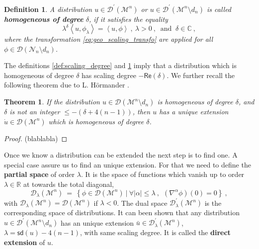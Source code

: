 \documentclass[12pt]{book}
\newcommand{\sd}{\mathsf{sd}}
\renewcommand{\Re}{\mathsf{Re}}
\newcommand{\abs}[1]{\left|#1\right|}
\newcommand{\sm}[1]{\left\langle#1\right\rangle}
\newcommand{\Dcal}{\mathcal{D}}
\newcommand{\Mcal}{\mathcal{M}}
\newcommand{\Ncal}{\mathcal{N}}
\newcommand{\Cbb}{\mathbb{C}}
\newcommand{\Rbb}{\mathbb{R}}
\theoremstyle{break}
\newtheorem{theorem}{Theorem}
\newtheorem{definition}{Definition}
\begin{document}
\begin{definition}\label{def:homogeneous}
A distribution $u \in \Dcal^\prime(\Mcal^n)$ or $u \in \Dcal^\prime(\Mcal^n\setminus d_n)$ is called {\bf homogeneous of degree} $\delta$, if it satisfies the equality
%
\begin{equation*}
\lambda^{\delta} \sm{ u , \phi_\lambda } = \sm{ u , \phi } \ , \ \lambda > 0 \ , \ \mbox{ and } \ \delta \in \Cbb \ ,
\end{equation*}
%
where the transformation \eqref{eq:geo_scaling_transfo} are applied for all $\phi \in \Dcal(\Ncal_n\setminus d_n)$.
\end{definition}


The definitions \ref{def:scaling_degree} and \ref{def:homogeneous} imply that a distribution which is homogeneous of degree $\delta$ has scaling degree $-\Re(\delta)$. We further recall the following theorem due to L. Hörmander \cite{hormander_analysis_1990}.


\begin{theorem}
If the distribution $u \in \Dcal(\Mcal^n\setminus d_n)$ is homogeneous of degree $\delta$, and
$\delta$ is not an integer $\leq -(\delta+4(n-1))$, then $u$ has a unique extension $\dot{u} \in \Dcal(\Mcal^n)$ which is homogeneous of degree $\delta$.
\end{theorem}


\begin{proof}
(blablabla)
\end{proof}


Once we know a distribution can be extended the next step is to find one. A special case assure us to find an unique extension. For that we need to define the \textbf{partial space} of order $\lambda$. It is the space of functions which vanish up to order $\lambda \in \Rbb$ at towards the total diagonal, 
%
\begin{equation*}
\Dcal_{\lambda}(\Mcal^n) \ = \ \left\{ \phi \in \Dcal(\Mcal^n) \ | \ \forall \abs{\alpha} \leq \lambda\ , \ \ \left(\nabla^{\alpha}\phi\right)(0)=0 \right\} \ ,
\end{equation*}
%
with $\Dcal_\lambda(\Mcal^n) = \Dcal(\Mcal^n)$ if $\lambda < 0$. The dual space $\Dcal^\prime_\lambda(\Mcal^n)$ is the corresponding space of distributions. It can been shown that any distribution $u \in \Dcal^\prime (\Mcal^n \setminus d_n )$ has an unique extension $\bar{u} \in \Dcal^\prime_\lambda(\Mcal^n)$, $\lambda = \sd(u) - 4(n-1)$, with same scaling degree. It is called the \textbf{direct extension} of $u$.
\end{document}

